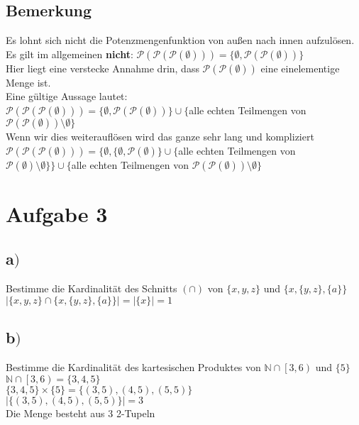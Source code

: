 \documentclass[18pt,a4paper]{article}
\begin{document}
	\subsection*{Bemerkung}
	Es lohnt sich nicht die Potenzmengenfunktion von außen nach innen aufzulösen.\\
	Es gilt im allgemeinen \textbf{nicht}: $\mathcal{P}(\mathcal{P}(\mathcal{P}(\emptyset))) = \{\emptyset , \mathcal{P}(\mathcal{P}(\emptyset)) \}$\\
	Hier liegt eine verstecke Annahme drin, dass $\mathcal{P}(\mathcal{P}(\emptyset))$ eine einelementige Menge ist.\\
	Eine gültige Aussage lautet:\\
	$\mathcal{P}(\mathcal{P}(\mathcal{P}(\emptyset))) = \{\emptyset , \mathcal{P}(\mathcal{P}(\emptyset)) \} \cup \{$alle echten Teilmengen von $\mathcal{P}(\mathcal{P}(\emptyset))\setminus\emptyset\}$\\
	Wenn wir dies weiterauflösen wird das ganze sehr lang und kompliziert\\
	$\mathcal{P}(\mathcal{P}(\mathcal{P}(\emptyset))) = \{\emptyset , \{\emptyset , \mathcal{P}(\emptyset)\} \cup \{ $alle echten Teilmengen von $\mathcal{P}(\emptyset)\setminus\emptyset\}\} \cup \{$alle echten Teilmengen von $\mathcal{P}(\mathcal{P}(\emptyset))\setminus\emptyset\}$\\
	
	
	\section*{Aufgabe 3}
	\subsection*{a$)$}
	Bestimme die Kardinalität des Schnitts  $(\cap)$  von $\{x, y, z\}$ und $\{x, \{y, z\}, \{a\}\}$\\
	$\lvert\{x, y, z\} \cap \{x, \{y, z\}, \{a\}\} \rvert = \lvert\{x{}\}\rvert = 1$
	
	\subsection*{b$)$}
	Bestimme die Kardinalität des kartesischen Produktes von $\mathbb{N} \cap \left[3,6 \right)$ und $\{5\}$\\
	\doublespacing
	$\mathbb{N} \cap \left[3,6 \right) = \{3,4,5\}$\\
	$\{3,4,5\} \times \{5\}=\{(3,5),(4,5),(5,5)\}$\\
	$\lvert \{(3,5),(4,5),(5,5)\} \rvert = 3$\\
	Die Menge besteht aus 3 2-Tupeln
	\singlespacing
	\newpage
\end{document}
